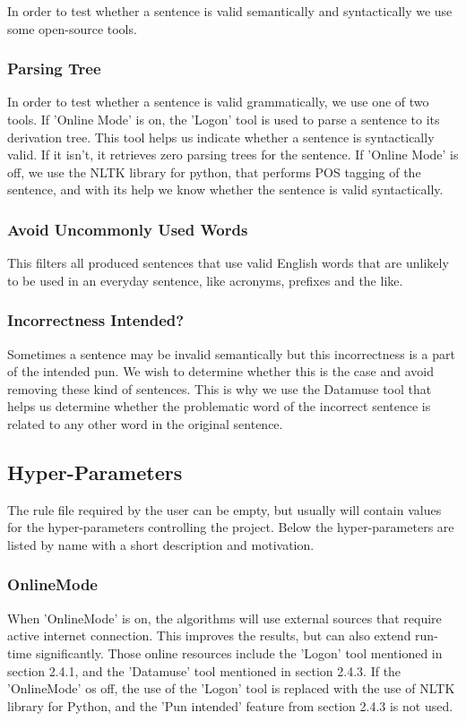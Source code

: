 \documentclass[11pt,a4paper]{article}
\begin{document}
In order to test whether a sentence is valid semantically and syntactically we use some open-source tools. 

\subsubsection{Parsing Tree}
In order to test whether a sentence is valid grammatically, we use one of two tools.
If 'Online Mode' is on, the 'Logon' tool  is used to parse a sentence to its derivation tree. This tool helps us indicate whether a sentence is syntactically valid. If it isn't, it retrieves zero parsing trees for the sentence. If 'Online Mode' is off, we use the NLTK library  for python, that performs POS tagging of the sentence, and with its help we know whether the sentence is valid syntactically.

\subsubsection{Avoid Uncommonly Used Words}
This filters all produced sentences that use valid English words that are unlikely to be used in an everyday sentence, like acronyms, prefixes and the like.

\subsubsection{Incorrectness Intended?}
Sometimes a sentence may be invalid semantically but this incorrectness is a part of the intended pun. We wish to determine whether this is the case and avoid removing these kind of sentences. This is why we use the Datamuse tool  that helps us determine whether the problematic word of the incorrect sentence is related to any other word in the original sentence. 

\subsection{Hyper-Parameters}

The rule file required by the user can be empty, but usually will contain values for the hyper-parameters controlling the project. Below the hyper-parameters are listed by name with a short description and motivation.

\subsubsection{OnlineMode}
When 'OnlineMode' is on, the algorithms will use external sources that require active internet connection. This improves the results, but can also extend run-time significantly. Those online resources include the 'Logon' tool mentioned in section 2.4.1, and the 'Datamuse' tool mentioned in section 2.4.3. 
If the 'OnlineMode' os off, the use of the 'Logon' tool is replaced with the use of NLTK library for Python, and the 'Pun intended' feature from section 2.4.3 is not used.
\end{document}
